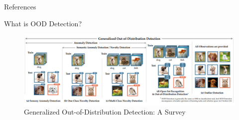 \documentclass[aspectratio=169]{beamer}
\begin{document}
\begin{frame}{References}
    
    

\end{frame}

\begin{frame}{What is OOD Detection?}
    \begin{figure}
        \centering
        \includegraphics[scale=0.3]{images/OOD_ex_new.jpg}
        \caption{Generalized Out-of-Distribution Detection: A Survey}
        \label{fig:my_label}
    \end{figure}
\end{frame}
\end{document}

